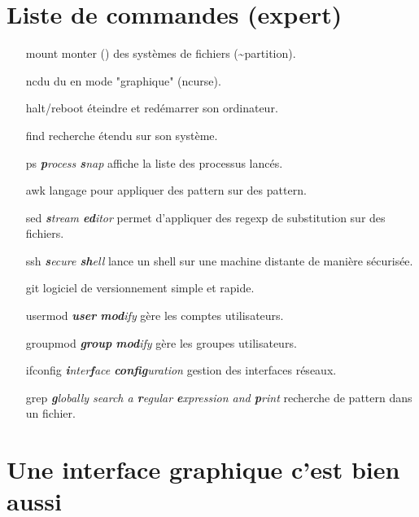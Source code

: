 \documentclass[french, a4paper, 12pt, titlepage]{article}
\begin{document}












\newpage


\section{Liste de commandes (expert)}
\begin{enumerate}
\item[mount] monter () des systèmes de fichiers (\~{}partition).
\item[ncdu] du en mode "graphique" (ncurse).
\item[halt/reboot] éteindre et redémarrer son ordinateur.
\item[find] recherche étendu sur son système.
\item[ps] \emph{\textbf{p}rocess \textbf{s}nap} affiche la liste des processus lancés.
\item[awk] langage pour appliquer des pattern sur des pattern.
\item[sed] \emph{\textbf{s}tream \textbf{ed}itor} permet d'appliquer des regexp de substitution sur des fichiers.
\item[ssh] \emph{\textbf{s}ecure \textbf{sh}ell} lance un shell sur une machine distante de manière sécurisée.
\item[git] logiciel de versionnement simple et rapide.
\item[usermod] \emph{\textbf{user} \textbf{mod}ify} gère les comptes utilisateurs.
\item[groupmod] \emph{\textbf{group} \textbf{mod}ify} gère les groupes utilisateurs.
\item[ifconfig] \emph{\textbf{i}nter\textbf{f}ace \textbf{config}uration} gestion des interfaces réseaux.
\item[grep] \emph{\textbf{g}lobally search a \textbf{r}egular \textbf{e}xpression and \textbf{p}rint} recherche de pattern dans un fichier.
\end{enumerate}















\section{Une interface graphique c'est bien aussi}
\end{document}
